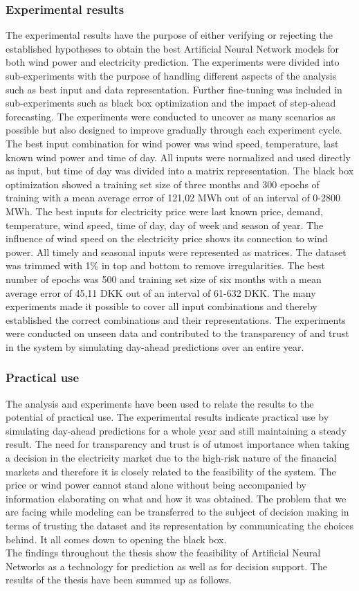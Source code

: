 \subsubsection{Experimental results}
The experimental results have the purpose of either verifying or rejecting the established hypotheses to obtain the best Artificial Neural Network models for both wind power and electricity prediction. The experiments were divided into sub-experiments with the purpose of handling different aspects of the analysis such as best input and data representation. Further fine-tuning was included in sub-experiments such as black box optimization and the impact of step-ahead forecasting. The experiments were conducted to uncover as many scenarios as possible but also designed to improve gradually through each experiment cycle. The best input combination for wind power was wind speed, temperature, last known wind power and time of day. All inputs were normalized and used directly as input, but time of day was divided into a matrix representation. The black box optimization showed a training set size of three months and 300 epochs of training with a mean average error of 121,02 MWh out of an interval of 0-2800 MWh. The best inputs for electricity price were last known price, demand, temperature, wind speed, time of day, day of week and season of year. The influence of wind speed on the electricity price shows its connection to wind power. All timely and seasonal inputs were represented as matrices. The dataset was trimmed with 1\% in top and bottom to remove irregularities. The best number of epochs was 500 and training set size of six months with a mean average error of 45,11 DKK out of an interval of 61-632 DKK. The many experiments made it possible to cover all input combinations and thereby established the correct combinations and their representations. The experiments were conducted on unseen data and contributed to the transparency of and trust in the system by simulating day-ahead predictions over an entire year.
\subsubsection{Practical use}
The analysis and experiments have been used to relate the results to the potential of practical use. The experimental results indicate practical use by simulating day-ahead predictions for a whole year and still maintaining a steady result. The need for transparency and trust is of utmost importance when taking a decision in the electricity market due to the high-risk nature of the financial markets and therefore it is closely related to the feasibility of the system. The price or wind power cannot stand alone without being accompanied by information elaborating on what and how it was obtained. The problem that we are facing while modeling can be transferred to the subject of decision making in terms of trusting the dataset and its representation by communicating the choices behind. It all comes down to opening the black box.
\\[1cm]
The findings throughout the thesis show the feasibility of Artificial Neural Networks as a technology for prediction as well as for decision support. The results of the thesis have been summed up as follows.

